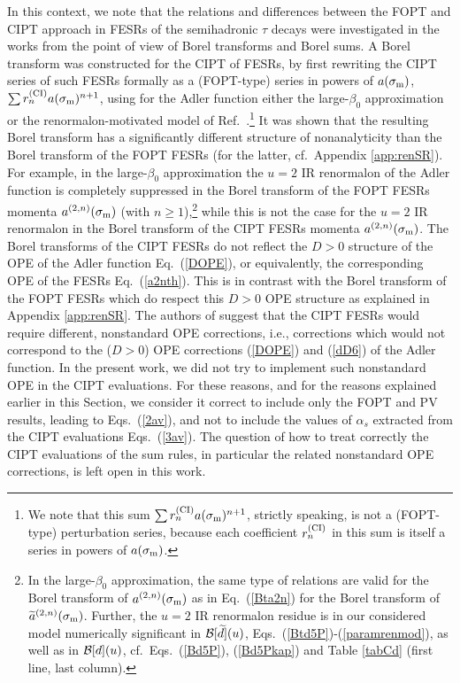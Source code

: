 \documentclass[aps,nofootinbib,showkeys,noshowpacs,preprintnumbers,amsmath,amssymb]{revtex4}
\newcommand{\sm}{{\sigma_{\rm m}}}
\newcommand{\ta}{{\widetilde a}}
\newcommand{\td}{{\widetilde d}}
\begin{document}
In this context, we note that the relations and differences between the FOPT and CIPT approach in FESRs of the semihadronic $\tau$ decays were investigated in the works \cite{HoangR} from the point of view of Borel transforms and Borel sums. A Borel transform was constructed for the CIPT of FESRs, by first rewriting the CIPT series of such FESRs formally as a (FOPT-type) series in powers of $a(\sm)$, $\sum r_n^{\rm (CI)} a(\sm)^{n+1}$, using for the Adler function either the large-$\beta_0$ approximation \cite{LB1,LB2} or the renormalon-motivated model of Ref.~\cite{BJ}.\footnote{We note that this sum $\sum r_n^{\rm (CI)} a(\sm)^{n+1}$, strictly speaking, is not a (FOPT-type) perturbation series, because each coefficient $r_n^{\rm (CI)}$ in this sum is itself a series in powers of $a(\sm)$.}  It was shown that the resulting Borel transform has a significantly different structure of nonanalyticity than the Borel transform of the FOPT FESRs (for the latter, cf.~Appendix \ref{app:renSR}). For example, in the large-$\beta_0$ approximation the $u=2$ IR renormalon of the Adler function is completely suppressed in the Borel transform of the FOPT FESRs momenta $a^{(2,n)}(\sm)$ (with $n \geq 1$),\footnote{In the large-$\beta_0$ approximation, the same type of relations are valid for the Borel transform of $a^{(2,n)}(\sm)$ as in Eq.~(\ref{Bta2n}) for the Borel transform of $\ta^{(2,n)}(\sm)$. Further, the $u=2$ IR renormalon residue is in our considered model numerically significant in ${\cal B}[\td](u)$, Eqs.~(\ref{Btd5P})-(\ref{paramrenmod}), as well as in ${\cal B}[d](u)$, cf.~Eqs.~(\ref{Bd5P}), (\ref{Bd5Pkap}) and Table \ref{tabCd} (first line, last column).} while this is not the case for the $u=2$ IR renormalon in the Borel transform of the CIPT FESRs momenta $a^{(2,n)}(\sm)$. The Borel transforms of the CIPT FESRs do not reflect the $D > 0$ structure of the OPE of the Adler function Eq.~(\ref{DOPE}), or equivalently, the corresponding OPE of the FESRs Eq.~(\ref{a2nth}). This is in contrast with the Borel transform of the FOPT FESRs which do respect this $D>0$ OPE structure as explained in Appendix \ref{app:renSR}. The authors of \cite{HoangR} suggest that the CIPT FESRs would require different, nonstandard OPE corrections, i.e., corrections which would not correspond to the ($D > 0$) OPE corrections (\ref{DOPE}) and (\ref{dD6}) of the Adler function. In the present work, we did not try to implement such nonstandard OPE in the CIPT evaluations. For these reasons, and for the reasons explained earlier in this Section, we consider it correct to include only the FOPT and PV results, leading to Eqs.~(\ref{2av}), and not to include the values of $\alpha_s$ extracted from the CIPT evaluations Eqs.~(\ref{3av}). The question of how to treat correctly the CIPT evaluations of the sum rules, in particular the related nonstandard OPE corrections, is left open in this work.
\end{document}
